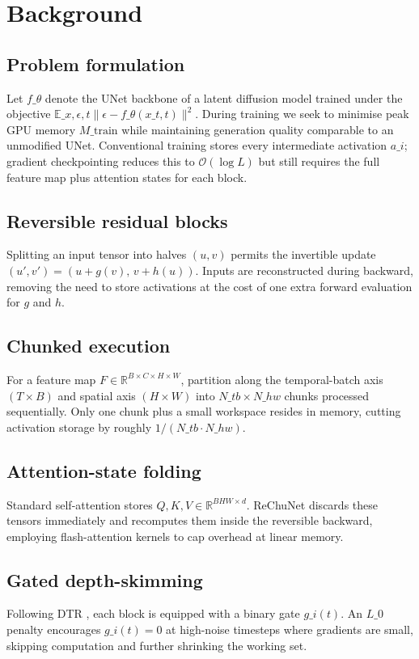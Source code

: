\documentclass{article}
\begin{document}
\section{Background}
\subsection{Problem formulation}
Let \(f\_{\theta}\) denote the UNet backbone of a latent diffusion model trained under the objective \(\mathbb{E}\_{x,\epsilon,t}\|\epsilon - f\_{\theta}(x\_t, t)\|^2\). During training we seek to minimise peak GPU memory \(M\_{\text{train}}\) while maintaining generation quality comparable to an unmodified UNet. Conventional training stores every intermediate activation \(a\_i\); gradient checkpointing reduces this to \(\mathcal{O}(\log L)\) but still requires the full feature map plus attention states for each block.

\subsection{Reversible residual blocks}
Splitting an input tensor into halves \((u, v)\) permits the invertible update \((u', v') = (u + g(v),\, v + h(u))\). Inputs are reconstructed during backward, removing the need to store activations at the cost of one extra forward evaluation for \(g\) and \(h\).

\subsection{Chunked execution}
For a feature map \(F \in \mathbb{R}^{B\times C\times H\times W}\), partition along the temporal-batch axis \((T \times B)\) and spatial axis \((H \times W)\) into \(N\_{tb} \times N\_{hw}\) chunks processed sequentially. Only one chunk plus a small workspace resides in memory, cutting activation storage by roughly \(1/(N\_{tb}\cdot N\_{hw})\).

\subsection{Attention-state folding}
Standard self-attention stores \(Q, K, V \in \mathbb{R}^{BHW\times d}\). ReChuNet discards these tensors immediately and recomputes them inside the reversible backward, employing flash-attention kernels to cap overhead at linear memory.

\subsection{Gated depth-skimming}
Following DTR \cite{park-2023-denoising}, each block is equipped with a binary gate \(g\_i(t)\). An \(L\_0\) penalty encourages \(g\_i(t)=0\) at high-noise timesteps where gradients are small, skipping computation and further shrinking the working set.
\end{document}
